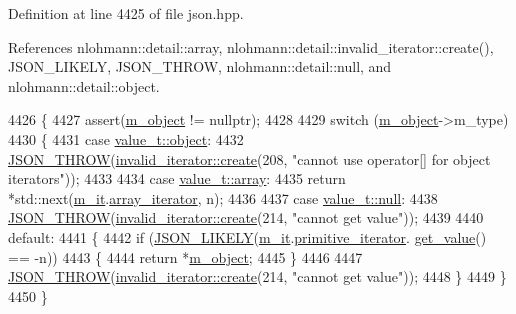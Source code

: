 Definition at line 4425 of file json.\+hpp.



References nlohmann\+::detail\+::array, nlohmann\+::detail\+::invalid\+\_\+iterator\+::create(), J\+S\+O\+N\+\_\+\+L\+I\+K\+E\+LY, J\+S\+O\+N\+\_\+\+T\+H\+R\+OW, nlohmann\+::detail\+::null, and nlohmann\+::detail\+::object.


\begin{DoxyCode}
4426     \{
4427         assert(\hyperlink{classnlohmann_1_1detail_1_1iter__impl_aca84f84be598bdfaaddd23d928c42bbb}{m\_object} != \textcolor{keyword}{nullptr});
4428 
4429         \textcolor{keywordflow}{switch} (\hyperlink{classnlohmann_1_1detail_1_1iter__impl_aca84f84be598bdfaaddd23d928c42bbb}{m\_object}->m\_type)
4430         \{
4431             \textcolor{keywordflow}{case} \hyperlink{namespacenlohmann_1_1detail_a1ed8fc6239da25abcaf681d30ace4985aa8cfde6331bd59eb2ac96f8911c4b666}{value\_t::object}:
4432                 \hyperlink{json_8hpp_a6c274f6db2e65c1b66c7d41b06ad690f}{JSON\_THROW}(\hyperlink{classnlohmann_1_1detail_1_1invalid__iterator_a4e849260a3caa1b288c7e619130c6c09}{invalid\_iterator::create}(208, \textcolor{stringliteral}{"cannot use
       operator[] for object iterators"}));
4433 
4434             \textcolor{keywordflow}{case} \hyperlink{namespacenlohmann_1_1detail_a1ed8fc6239da25abcaf681d30ace4985af1f713c9e000f5d3f280adbd124df4f5}{value\_t::array}:
4435                 \textcolor{keywordflow}{return} *std::next(\hyperlink{classnlohmann_1_1detail_1_1iter__impl_a8a86a7c0d4af0cc4ab345b6f0e13cdfa}{m\_it}.\hyperlink{structnlohmann_1_1detail_1_1internal__iterator_a8294a6e6f01b58e1cce8fbae66a50b5d}{array\_iterator}, n);
4436 
4437             \textcolor{keywordflow}{case} \hyperlink{namespacenlohmann_1_1detail_a1ed8fc6239da25abcaf681d30ace4985a37a6259cc0c1dae299a7866489dff0bd}{value\_t::null}:
4438                 \hyperlink{json_8hpp_a6c274f6db2e65c1b66c7d41b06ad690f}{JSON\_THROW}(\hyperlink{classnlohmann_1_1detail_1_1invalid__iterator_a4e849260a3caa1b288c7e619130c6c09}{invalid\_iterator::create}(214, \textcolor{stringliteral}{"cannot get
       value"}));
4439 
4440             \textcolor{keywordflow}{default}:
4441             \{
4442                 \textcolor{keywordflow}{if} (\hyperlink{json_8hpp_a41ecd1c4cf7c3d56477b9b685b5daa72}{JSON\_LIKELY}(\hyperlink{classnlohmann_1_1detail_1_1iter__impl_a8a86a7c0d4af0cc4ab345b6f0e13cdfa}{m\_it}.\hyperlink{structnlohmann_1_1detail_1_1internal__iterator_a2b3bb45f968210e42c282017eeeb63a8}{primitive\_iterator}.
      \hyperlink{classnlohmann_1_1detail_1_1primitive__iterator__t_ae952990886ca1756229f916661a8af81}{get\_value}() == -n))
4443                 \{
4444                     \textcolor{keywordflow}{return} *\hyperlink{classnlohmann_1_1detail_1_1iter__impl_aca84f84be598bdfaaddd23d928c42bbb}{m\_object};
4445                 \}
4446 
4447                 \hyperlink{json_8hpp_a6c274f6db2e65c1b66c7d41b06ad690f}{JSON\_THROW}(\hyperlink{classnlohmann_1_1detail_1_1invalid__iterator_a4e849260a3caa1b288c7e619130c6c09}{invalid\_iterator::create}(214, \textcolor{stringliteral}{"cannot get
       value"}));
4448             \}
4449         \}
4450     \}
\end{DoxyCode}
